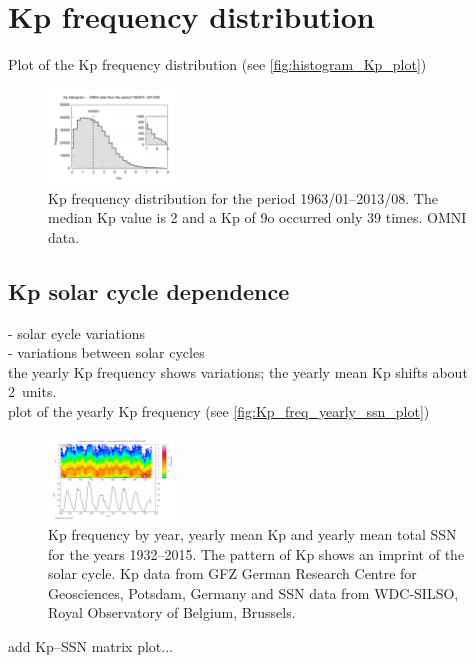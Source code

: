 \section{Kp frequency distribution}
Plot of the Kp frequency distribution (see \autoref{fig:histogram_Kp_plot})	%
\begin{figure}[htb]
	\centering
	\includegraphics[width=0.3\textwidth]{images/gnuplots/histogram_Kp_plot.pdf}
	\caption{Kp frequency distribution for the period 1963/01--2013/08. The median Kp value is 2 and a Kp of 9o occurred only 39 times. OMNI data.}
	\label{fig:histogram_Kp_plot}
\end{figure}

\subsection{Kp solar cycle dependence}
- solar cycle variations\\
- variations between solar cycles\\

the yearly Kp frequency shows variations; the yearly mean Kp shifts about 2~units.\\
plot of the yearly Kp frequency (see \autoref{fig:Kp_freq_yearly_ssn_plot})
\begin{figure}[htb]
	\centering
	\includegraphics[width=0.3\textwidth]{images/gnuplots/Kp_freq_yearly_ssn_plot.png}
	\caption{Kp frequency by year, yearly mean Kp and yearly mean total SSN for the years 1932--2015. The pattern of Kp shows an imprint of the solar cycle. Kp data from GFZ German Research Centre for Geosciences, Potsdam, Germany and SSN data from WDC-SILSO, Royal Observatory of Belgium, Brussels.}
	\label{fig:Kp_freq_yearly_ssn_plot}
\end{figure}
add Kp--SSN matrix plot...\\

